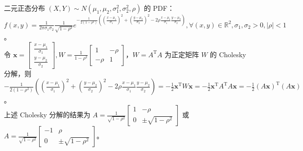 \documentclass[../main.tex]{subfiles}
\begin{document}
\begin{example}\label{BVN}
二元正态分布 $(X,Y)\sim N(\mu_1,\mu_2,\sigma_1^2,\sigma_2^2,\rho)$ 的 PDF：\\
$f(x,y)=\frac{1}{2\pi\sigma_1\sigma_2}\frac{1}{\sqrt{1-\rho^2}}e^{-\frac{1}{2(1-\rho^2)}((\frac{x-\mu_1}{\sigma_1})^2+(\frac{y-\mu_2}{\sigma_2})^2-2\rho\frac{x-\mu_1}{\sigma_1}\frac{y-\mu_2}{\sigma_2})},\forall (x,y)\in\mathbb R^2,\sigma_1,\sigma_2>0,|\rho|<1$。\\
令 $\boldsymbol{x}=\left[\begin{matrix}
\frac{x-\mu_1}{\sigma_1}\\
\frac{y-\mu_2}{\sigma_2}
\end{matrix}\right],W=\frac1{1-\rho^2}\left[\begin{matrix}
1 & -\rho\\
-\rho & 1
\end{matrix}\right]$，$W=A^\mathrm TA$ 为正定矩阵 $W$ 的 Cholesky 分解，则 $-\frac{1}{2(1-\rho^2)}((\frac{x-\mu_1}{\sigma_1})^2+(\frac{y-\mu_2}{\sigma_2})^2-2\rho\frac{x-\mu_1}{\sigma_1}\frac{y-\mu_2}{\sigma_2})=-\frac12\boldsymbol{x}^\mathrm TW\boldsymbol{x}=-\frac12\boldsymbol{x}^\mathrm TA^\mathrm TA\boldsymbol{x}=-\frac12 (A\boldsymbol x)^\mathrm T(A\boldsymbol x)$。\\
上述 Cholesky 分解的结果为 $A=\frac{1}{\sqrt{1-\rho^2}}\left[\begin{matrix}
1 & -\rho\\
0 & \pm \sqrt{1-\rho^2}
\end{matrix}\right]
$ 或 $A=\frac{1}{\sqrt{1-\rho^2}}\left[\begin{matrix}
-1 & \rho\\
0 & \pm \sqrt{1-\rho^2}
\end{matrix}\right]
$。
\end{example}
\end{document}
